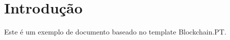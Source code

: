 \newpage
\thispagestyle{otherpages}
\section{Introdução}
Este é um exemplo de documento baseado no template Blockchain.PT.